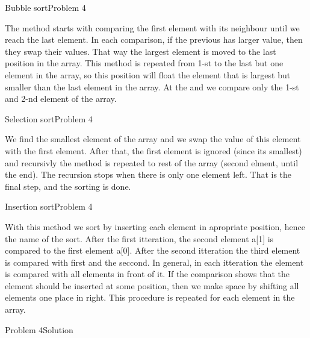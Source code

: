 \begin{frame}[fragile]{Bubble sort}{Problem 4}
\begin{scriptsize}
The method starts with comparing the first element with its neighbour until we
reach the last element. In each comparison, if the previous has larger value,
then they swap their values. That way the largest element is moved to the last
position in the array. This method is repeated from 1-st to the last but one
element in the array, so this position will float the element that is largest
but smaller than the last element in the array. At the and we compare only the
1-st and 2-nd element of the array.
\end{scriptsize}

\end{frame}

\begin{frame}[fragile]{Selection sort}{Problem 4}
\begin{scriptsize}
We find the smallest element of the array and we swap the value of this element
with the first element. After that, the first element is ignored (since its
smallest) and recursivly the method is repeated to rest of the array (second
elment, until the end). The recursion stops when there is only one element left.
That is the final step, and the sorting is done.
\end{scriptsize}

\end{frame}

\begin{frame}[fragile]{Insertion sort}{Problem 4}
\begin{scriptsize}
With this method we sort by inserting each element in apropriate position, hence
the name of the sort. After the first itteration, the second element a[1] is
compared to the first element a[0]. After the second itteration the third
element is compared with first and the seccond. In general, in each itteration
the element is compared with all elements in front of it. If the comparison
shows that the element should be inserted at some position, then we make space
by shifting all elements one place in right. This procedure is repeated for
each element in the array.
\end{scriptsize}

\end{frame}

\begin{frame}[fragile]{Problem 4}{Solution}

\end{frame}
